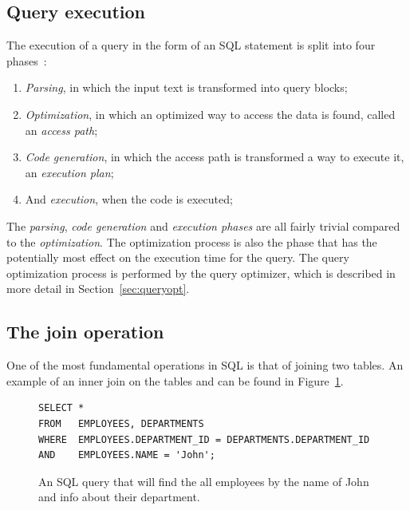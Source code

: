 \subsection{Query execution}
The execution of a query in the form of an SQL statement is split into four phases~\cite{selinger_1979_access_apsiardms}:
\begin{enumerate}
    \item \textit{Parsing}, in which the input text is transformed into query blocks;
    \item \textit{Optimization}, in which an optimized way to access the data is found, called an \textit{access path};
    \item \textit{Code generation}, in which the access path is transformed a way to execute it, an \textit{execution plan};
    \item And \textit{execution}, when the code is executed;
\end{enumerate}

The \textit{parsing}, \textit{code generation} and \textit{execution phases} are
all fairly trivial compared to the \textit{optimization}. The optimization
process is also the phase that has the potentially most effect on the execution
time for the query. The query optimization process is performed by the query
optimizer, which is described in more detail in Section~\ref{sec:queryopt}.

\subsection{The join operation}
One of the most fundamental operations in SQL is that of joining two tables. An
example of an inner join on the tables  and  can
be found in Figure~\ref{fig:sql:joinop}.

\begin{figure}[ht]
\begin{verbatim}
SELECT *
FROM   EMPLOYEES, DEPARTMENTS
WHERE  EMPLOYEES.DEPARTMENT_ID = DEPARTMENTS.DEPARTMENT_ID
AND    EMPLOYEES.NAME = 'John';
\end{verbatim}
\caption[An example of an SQL query]{An SQL query that will find the all employees by the name of John and info about their department.}\label{fig:sql:joinop}
\end{figure}


